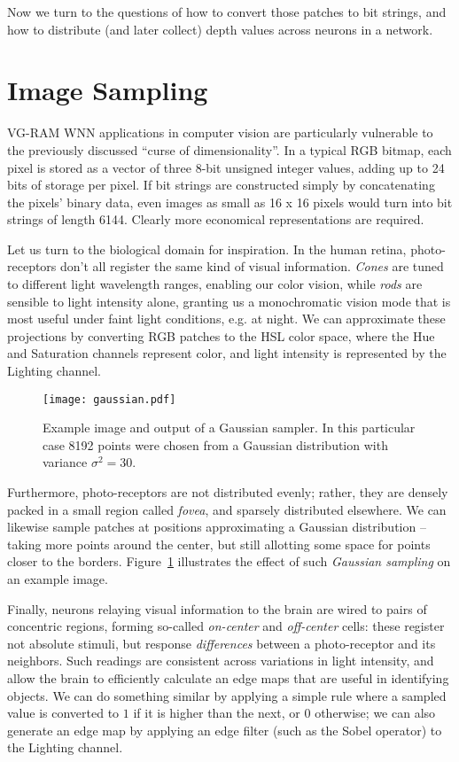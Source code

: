 \documentclass[twocolumn, 9pt]{jsproceedings}
\begin{document}
Now we turn to the questions of how to convert those patches to bit strings, and how to distribute (and later collect) depth values across neurons in a network.

\section{Image Sampling}

VG-RAM WNN applications in computer vision are particularly vulnerable to the previously discussed ``curse of dimensionality''. In a typical RGB bitmap, each pixel is stored as a vector of three 8-bit unsigned integer values, adding up to 24 bits of storage per pixel. If bit strings are constructed simply by concatenating the pixels' binary data, even images as small as 16 x 16 pixels would turn into bit strings of length 6144. Clearly more economical representations are required.

Let us turn to the biological domain for inspiration. In the human retina, photo-receptors don't all register the same kind of visual information. {\it Cones} are tuned to different light wavelength ranges, enabling our color vision, while {\it rods} are sensible to light intensity alone, granting us a monochromatic vision mode that is most useful under faint light conditions, e.g. at night. We can approximate these projections by converting RGB patches to the HSL color space, where the Hue and Saturation channels represent color, and light intensity is represented by the Lighting channel.

\begin{figure}[h!]
\texttt{[image: gaussian.pdf]}
\caption{Example image and output of a Gaussian sampler. In this particular case 8192 points were chosen from a Gaussian distribution with variance \(\sigma^2 = 30\).}
\label{fig:gaussian}
\end{figure}

Furthermore, photo-receptors are not distributed evenly; rather, they are densely packed in a small region called {\it fovea}, and sparsely distributed elsewhere. We can likewise sample patches at positions approximating a Gaussian distribution -- taking more points around the center, but still allotting some space for points closer to the borders. Figure~\ref{fig:gaussian} illustrates the effect of such {\it Gaussian sampling} on an example image.

Finally, neurons relaying visual information to the brain are wired to pairs of concentric regions, forming so-called {\it on-center} and {\it off-center} cells: these register not absolute stimuli, but response {\it differences} between a photo-receptor and its neighbors. Such readings are consistent across variations in light intensity, and allow the brain to efficiently calculate an edge maps that are useful in identifying objects. We can do something similar by applying a simple rule where a sampled value is converted to \(1\) if it is higher than the next, or \(0\) otherwise; we can also generate an edge map by applying an edge filter (such as the Sobel operator) to the Lighting channel.
\end{document}
